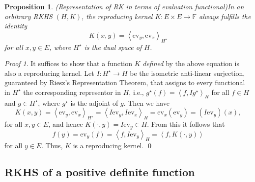 \documentclass[a4paper,12pt]{article}
\newtheorem{prp}[thm]{Proposition}
\theoremstyle{remark}
\newtheorem*{prf}{Proof}
\theoremstyle{definition}
\theoremstyle{definition}
\theoremstyle{definition}
\newcommand{\ip}[2]{\left<#1, #2 \right>}
\newcommand{\ev}[1]{\mathrm{ev}_{#1}}
\newcommand{\adj}[1]{#1^{\star}}
\begin{document}
\begin{prp} (Representation of RK in terms of evaluation functional)\label{Representation of RK in terms of ev}
	In an arbitrary RKHS \( (H,K) \), the reproducing kernel \( K:E \times E \to \mathbb{F} \) always fulfills the identity
	\begin{equation*}
		K(x,y) = \ip{\ev{y}}{\ev{x}}_{\adj{H}}
	\end{equation*}
	for all \( x,y \in E \), where \( \adj{H} \) is the dual space of \( H \).
\end{prp}
\begin{prf}
	It suffices to show that a function \( K \) \textit{defined} by the above equation is also a reproducing kernel.
	Let \( I:\adj{H}\to H \) be the isometric anti-linear surjection,  guaranteed by Riesz's Representation Theorem, that assigns to every functional in \( \adj{H} \) the corresponding representor in \( H \), i.e., \( \adj{g}(f)=\ip{f}{I \adj{g}}_H \) for all \( f \in H \) and \( g \in \adj{H} \), where \( \adj{g} \) is the adjoint of \( g \). Then we have
	\begin{equation*}
		K(x,y) = \ip{\ev{y}}{\ev{x}}_{\adj{H}}
		= \ip{I \ev{y}}{I \ev{x}}_H
		= \ev{x} \left( \ev{y} \right) = \left( I \ev{y} \right)(x),
	\end{equation*}
	for all \( x,y \in E \), and hence \( K(\cdot ,y) = I \ev{y} \in H \). From this it follows that
	\begin{equation*}
		f(y) = \ev{y}(f) = \ip{f}{I \ev{y}}_H = \ip{f}{K(\cdot ,y)}
	\end{equation*}
	for all \( y \in E \). Thus, \( K \) is a reproducing kernel.
	\qed\end{prf}


\subsection{RKHS of a positive definite function} \label{rkhs of a pd kernel }
\end{document}

